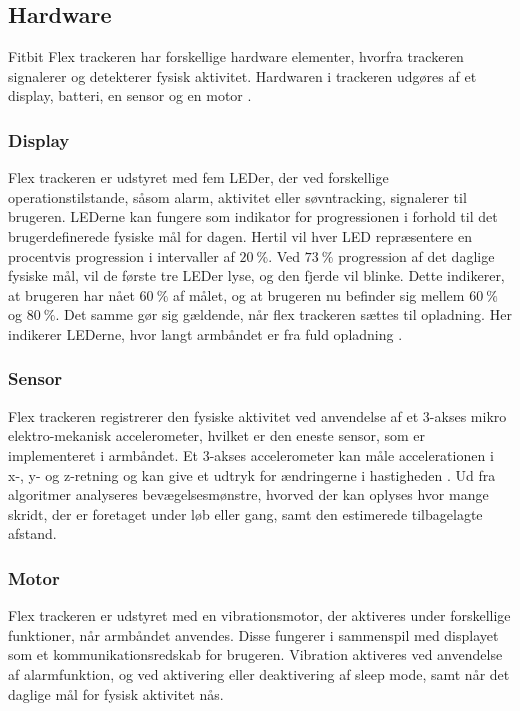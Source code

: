 \subsection{Hardware}
Fitbit Flex trackeren har forskellige hardware elementer, hvorfra trackeren signalerer og detekterer fysisk aktivitet. Hardwaren i trackeren udgøres af et display, batteri, en sensor og en motor \citep{fitbitflex}.
 
\subsubsection{Display} 
Flex trackeren er udstyret med fem LEDer, der ved forskellige operationstilstande, såsom alarm, aktivitet eller søvntracking, signalerer til brugeren. 
LEDerne kan fungere som indikator for progressionen i forhold til det brugerdefinerede fysiske mål for dagen. Hertil vil hver LED repræsentere en procentvis progression i intervaller af $20~\%$. Ved $73~\%$ progression af det daglige fysiske mål, vil de første tre LEDer lyse, og den fjerde vil blinke. Dette indikerer, at brugeren har nået $60~\%$ af målet, og at brugeren nu befinder sig mellem $60~\%$ og $80~\%$. 
Det samme gør sig gældende, når flex trackeren sættes til opladning. Her indikerer LEDerne, hvor langt armbåndet er fra fuld opladning \citep{fitbitflex}. 


\subsubsection{Sensor} 
Flex trackeren registrerer den fysiske aktivitet ved anvendelse af et 3-akses mikro elektro-mekanisk accelerometer, hvilket er den eneste sensor, som er implementeret i armbåndet. Et 3-akses accelerometer kan måle accelerationen i x-, y- og z-retning og kan give et udtryk for ændringerne i hastigheden \citep{ravi2005}. Ud fra algoritmer analyseres bevægelsesmønstre, hvorved der kan oplyses hvor mange skridt, der er foretaget under løb eller gang, samt den estimerede tilbagelagte afstand. 

\subsubsection{Motor}
Flex trackeren er udstyret med en vibrationsmotor, der aktiveres under forskellige funktioner, når armbåndet anvendes. Disse fungerer i sammenspil med displayet som et kommunikationsredskab for brugeren. Vibration aktiveres ved anvendelse af alarmfunktion, og ved aktivering eller deaktivering af sleep mode, samt når det daglige mål for fysisk aktivitet nås. 

